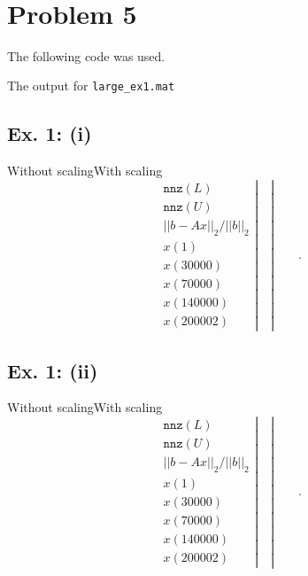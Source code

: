 \documentclass[11pt]{article}
\theoremstyle{definition}
\theoremstyle{remark}
\newcommand{\newquestion}{\hrulefill\vspace{-0.8\baselineskip}\\\null\hrulefill\vspace{-1.0\baselineskip}}
\newcommand{\newpart}{\vspace{-0.5\baselineskip}\hrulefill\vspace{-1.3\baselineskip}}
\theoremstyle{plain}
\begin{document}
\newquestion
%
%
\section*{Problem 5}
The following code was used.
\newpage

The output for \texttt{large\_ex1.mat}

\newpart
\subsection*{Ex. 1: (i)}
\hspace{6cm}Without scaling\hspace{3.25cm}With scaling
\begin{equation*}
    \left.\begin{array}{c}
      \texttt{nnz}(L)\\
      \texttt{nnz}(U)\\
      ||b-Ax||_2/||b||_2\\
      x(1)\\
      x(30000)\\
      x(70000)\\
      x(140000)\\
      x(200002)
    \end{array}\right|\quad
    \left.\right|\qquad
    .
\end{equation*}

\newpart
\subsection*{Ex. 1: (ii)}
\hspace{6cm}Without scaling\hspace{3.25cm}With scaling
\begin{equation*}
    \left.\begin{array}{c}
      \texttt{nnz}(L)\\
      \texttt{nnz}(U)\\
      ||b-Ax||_2/||b||_2\\
      x(1)\\
      x(30000)\\
      x(70000)\\
      x(140000)\\
      x(200002)
    \end{array}\right|\quad
    \left.\right|\qquad
    .
\end{equation*}
\end{document}
